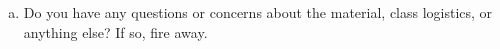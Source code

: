 \documentclass{article}\usepackage{graphicx, color}
\numberwithin{equation}{section}
\begin{document}
\begin{flushleft}
\begin{enumerate}[1. ]
\begin{enumerate}[a. ]
\item Do you have any questions or concerns about the material, class logistics, or anything else? If so, fire away.

\end{enumerate}

\end{enumerate}

\end{flushleft}
\end{document}
